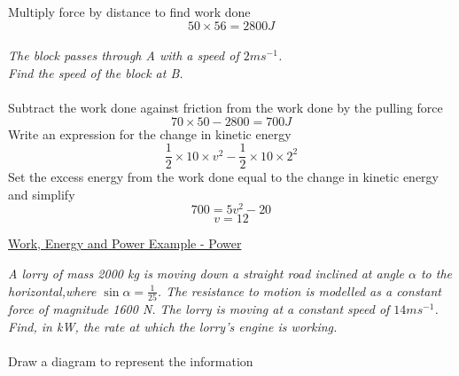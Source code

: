 \documentclass{article}[18pt]
\begin{document}
Multiply force by distance to find work done
$$50\times56=2800J$$
\\
\textit{The block passes through A with a speed of $2ms^{-1}$.\\
Find the speed of the block at B.}
\\
\\
Subtract the work done against friction from the work done by the pulling force
$$70\times50-2800=700J$$
Write an expression for the change in kinetic energy
$$\frac{1}{2}\times10\times v^2-\frac{1}{2}\times10\times2^2$$
Set the excess energy from the work done equal to the change in kinetic energy and simplify
$$700=5v^2-20$$
$$v=12$$
\newpage
\begin{center}
\underline{\huge Work, Energy and Power Example - Power}
\end{center}
\textit{A lorry of mass 2000 kg is moving down a straight road inclined at angle $\alpha$ to the horizontal,where $\sin\alpha=\frac{1}{25}$. The resistance to motion is modelled as a constant force of magnitude 1600 N. The lorry is moving at a constant speed of $14ms^{-1}$.\\
Find, in kW, the rate at which the lorry's engine is working.}
\\
\\
Draw a diagram to represent the information
\def\iangle{35} %
\end{document}
